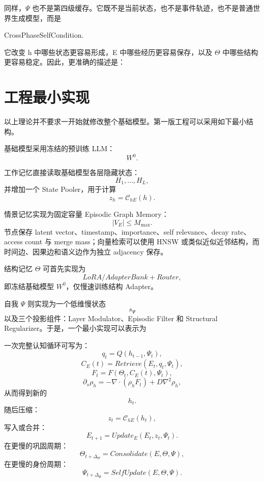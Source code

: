 同样，$\Psi$ 也不是第四级缓存。它既不是当前状态，也不是事件轨迹，也不是普通世界生成模型，而是
\begin{statementbox}
CrossPhaseSelfCondition.
\end{statementbox}
它改变 h 中哪些状态更容易形成，E 中哪些经历更容易保存，以及 $\Theta$ 中哪些结构更容易稳定。因此，更准确的描述是：
\begin{statementbox}
\centering
{}
\end{statementbox}

\section{工程最小实现}

以上理论并不要求一开始就修改整个基础模型。第一版工程可以采用如下最小结构。

基础模型采用冻结的预训练 LLM：
\[
W^0.
\]

工作记忆直接读取基础模型各层隐藏状态：
\[
H_1,\ldots,H_L,
\]
并增加一个 State Pooler，用于计算
\[
z_h
=
\mathcal{C}_{hE}(h).
\]

情景记忆实现为固定容量 Episodic Graph Memory：
\[
|V_E|
\leq
M_{\max}.
\]
节点保存 latent vector、timestamp、importance、self relevance、decay rate、access count 与 merge mass；向量检索可以使用 HNSW 或类似近似近邻结构，而时间边、因果边和语义边作为独立 adjacency 保存。

结构记忆 $\Theta$ 可首先实现为
\[
LoRA/AdapterBank+Router,
\]
即冻结基础模型 $W^0$，仅慢速训练结构 Adapter。

自我 $\Psi$ 则实现为一个低维慢状态
\[
s_\Psi
\]
以及三个投影组件：Layer Modulator、Episodic Filter 和 Structural Regularizer。于是，一个最小实现可以表示为
\begin{statementbox}
\centering
{}
\end{statementbox}

一次完整认知循环可写为：
\[
q_t
=
Q
\left(
h_{t-1},\Psi_t
\right),
\]
\[
C_E(t)
=
Retrieve
\left(
E_t,q_t,\Psi_t
\right),
\]
\[
F_t
=
F
\left(
\Theta_t,C_E(t),\Psi_t
\right),
\]
\[
\partial_s\rho_h
=
-\nabla\cdot
\left(
\rho_hF_t
\right)
+
D\nabla^2\rho_h,
\]
从而得到新的
\[
h_t.
\]
随后压缩：
\[
z_t
=
\mathcal{C}_{hE}
\left(
h_t
\right),
\]
写入或合并：
\[
E_{t+1}
=
Update_E
\left(
E_t,z_t,\Psi_t
\right).
\]
在更慢的巩固周期：
\[
\Theta_{t+\Delta_\Theta}
=
Consolidate
\left(
E,\Theta,\Psi
\right),
\]
在更慢的身份周期：
\[
\Psi_{t+\Delta_\Psi}
=
SelfUpdate
\left(
E,\Theta,\Psi
\right).
\]

